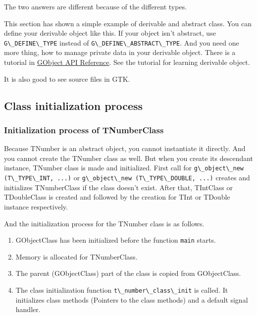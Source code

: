 The two answers are different because of the different types.

This section has shown a simple example of derivable and abstract class.
You can define your derivable object like this. If your object isn't
abstract, use \passthrough{\lstinline!G\_DEFINE\_TYPE!} instead of
\passthrough{\lstinline!G\_DEFINE\_ABSTRACT\_TYPE!}. And you need one
more thing, how to manage private data in your derivable object. There
is a tutorial in
\href{https://docs.gtk.org/gobject/tutorial.html\#gobject-tutorial}{GObject
API Reference}. See the tutorial for learning derivable object.

It is also good to see source files in GTK.

\subsection{Class initialization
process}\label{class-initialization-process}

\subsubsection{Initialization process of
TNumberClass}\label{initialization-process-of-tnumberclass}

Because TNumber is an abstract object, you cannot instantiate it
directly. And you cannot create the TNumber class as well. But when you
create its descendant instance, TNumber class is made and initialized.
First call for
\passthrough{\lstinline!g\_object\_new (T\_TYPE\_INT, ...)!} or
\passthrough{\lstinline!g\_object\_new (T\_TYPE\_DOUBLE, ...)!} creates
and initializes TNumberClass if the class doesn't exist. After that,
TIntClass or TDoubleClass is created and followed by the creation for
TInt or TDouble instance respectively.

And the initialization process for the TNumber class is as follows.

\begin{enumerate}
\def\labelenumi{\arabic{enumi}.}
\tightlist
\item
  GObjectClass has been initialized before the function
  \passthrough{\lstinline!main!} starts.
\item
  Memory is allocated for TNumberClass.
\item
  The parent (GObjectClass) part of the class is copied from
  GObjectClass.
\item
  The class initialization function
  \passthrough{\lstinline!t\_number\_class\_init!} is called. It
  initializes class methods (Pointers to the class methods) and a
  default signal handler.
\end{enumerate}

